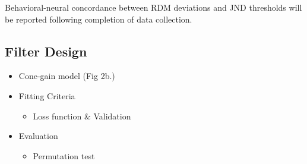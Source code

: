 \documentclass[a4paper,11pt]{article}
\begin{document}
Behavioral-neural concordance between RDM deviations and JND thresholds will be reported following completion of data collection.

\subsection*{Filter Design}

\begin{itemize}
\item Cone-gain model (Fig 2b.)
\item Fitting Criteria
\begin{itemize}
\item Loss function \& Validation
\end{itemize}
\item Evaluation
\begin{itemize}
\item Permutation test
\end{itemize}
\end{itemize}




\end{document}
